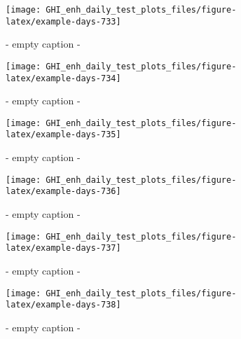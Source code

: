 \documentclass[
  10pt,
  a4paper,oneside]{article}
\begin{document}
\begin{figure}[H]

{\centering \texttt{[image: GHI\_enh\_daily\_test\_plots\_files/figure-latex/example-days-733]} 

}

\caption{ - empty caption - }\label{fig:example-days-733}
\end{figure}

\begin{figure}[H]

{\centering \texttt{[image: GHI\_enh\_daily\_test\_plots\_files/figure-latex/example-days-734]} 

}

\caption{ - empty caption - }\label{fig:example-days-734}
\end{figure}

\begin{figure}[H]

{\centering \texttt{[image: GHI\_enh\_daily\_test\_plots\_files/figure-latex/example-days-735]} 

}

\caption{ - empty caption - }\label{fig:example-days-735}
\end{figure}

\begin{figure}[H]

{\centering \texttt{[image: GHI\_enh\_daily\_test\_plots\_files/figure-latex/example-days-736]} 

}

\caption{ - empty caption - }\label{fig:example-days-736}
\end{figure}

\begin{figure}[H]

{\centering \texttt{[image: GHI\_enh\_daily\_test\_plots\_files/figure-latex/example-days-737]} 

}

\caption{ - empty caption - }\label{fig:example-days-737}
\end{figure}

\begin{figure}[H]

{\centering \texttt{[image: GHI\_enh\_daily\_test\_plots\_files/figure-latex/example-days-738]} 

}

\caption{ - empty caption - }\label{fig:example-days-738}
\end{figure}
\end{document}
